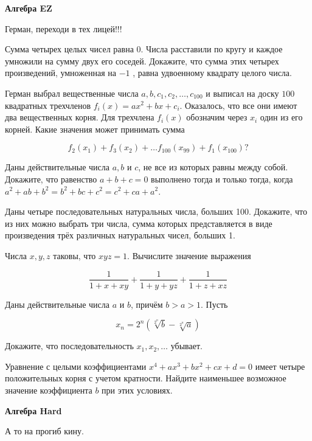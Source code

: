 \centerline{\bf \Huge Алгебра EZ}

\begin{flushright}
        \scriptsize{Герман, переходи в тех лицей!!!}
\end{flushright}

Сумма четырех целых чисел равна 0. Числа расставили по кругу и каждое умножили на сумму двух его соседей. Докажите, что сумма этих четырех произведений, умноженная на $-1$ , равна удвоенному квадрату целого числа.

Герман выбрал вещественные числа $a, b, c_1, c_2, \ldots, c_{100}$ и выписал на доску $100$ квадратных трехчленов $f_i(x)=a x^2+b x+c_i$. Оказалось, что все они имеют два вещественных корня. Для трехчлена $f_i(x)$ обозначим через $x_i$ один из его корней. Какие значения может принимать сумма

$$
f_2\left(x_1\right)+f_3\left(x_2\right)+\ldots f_{100}\left(x_{99}\right)+f_1\left(x_{100}\right)?
$$

Даны действительные числа $a, b$ и $c$, не все из которых равны между собой. Докажите, что равенство $a+b+c=0$ выполнено тогда и только тогда, когда $a^2+a b+b^2=b^2+b c+c^2=c^2+c a+a^2$.

Даны четыре последовательных натуральных числа, больших 100. Докажите, что из них можно выбрать три числа, сумма которых представляется в виде произведения трёх различных натуральных чисел, больших 1.

Числа $x, y, z$ таковы, что $x y z=1$. Вычислите значение выражения

$$
\frac{1}{1+x+x y}+\frac{1}{1+y+y z}+\frac{1}{1+z+x z}
$$


Даны действительные числа $a$ и $b$, причём $b>a>1$. Пусть

$$
x_n=2^n(\sqrt[2^n]{b}-\sqrt[2^n]{a})
$$


Докажите, что последовательность $x_1, x_2, \ldots$ убывает.

Уравнение с целыми коэффициентами $x^4+a x^3+b x^2+c x+d=0$ имеет четыре положительных корня с учетом кратности. Найдите наименьшее возможное значение коэффициента $b$ при этих условиях.

\newpage

\hspace{3mm}

\centerline{\bf \Huge Алгебра Hard}

\begin{flushright}
        \scriptsize{А то на прогиб кину.}
\end{flushright}

